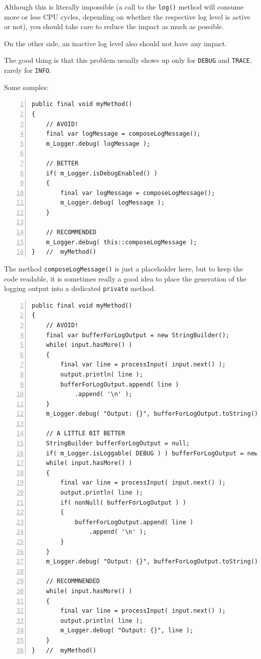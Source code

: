 \documentclass[11pt,a4paper, titlepage, parskip=half, headsepline, footsepline, cleardoublepage=current, headheight=1cm]{scrbook}
\begin{document}
Although this is literally impossible (a call to the \lstinline|log()| method will consume more or less CPU cycles, depending on whether the respective log level is active or not), you should take care to reduce the impact as much as possible.

On the other side, an inactive log level also should not have any impact.

The good thing is that this problem usually shows up only for \verb#DEBUG# and \verb#TRACE#, rarely for \verb#INFO#.

Some samples:
\begin{lstlisting}[numbers=left]
public final void myMethod()
{
    // AVOID!
    final var logMessage = composeLogMessage();
    m_Logger.debug( logMessage );
    
    // BETTER
    if( m_Logger.isDebugEnabled() )
    {
        final var logMessage = composeLogMessage();
        m_Logger.debug( logMessage );
    }
    
    // RECOMMENDED
    m_Logger.debug( this::composeLogMessage );
}   //  myMethod()
\end{lstlisting}

The method \lstinline|composeLogMessage()| is just a placeholder here, but to keep the code readable, it is sometimes really a good idea to place the generation of the logging output into a dedicated \lstinline|private| method.

\begin{lstlisting}[numbers=left]
public final void myMethod()
{
    // AVOID!
    final var bufferForLogOutput = new StringBuilder();
    while( input.hasMore() )
    {
        final var line = processInput( input.next() );
        output.println( line );
        bufferForLogOutput.append( line )
            .append( '\n' );
    }
    m_Logger.debug( "Output: {}", bufferForLogOutput.toString() );
    
    // A LITTLE BIT BETTER
    StringBuilder bufferForLogOutput = null;
    if( m_Logger.isLoggable( DEBUG ) ) bufferForLogOutput = new StringBuilder();
    while( input.hasMore() )
    {
        final var line = processInput( input.next() );
        output.println( line );
        if( nonNull( bufferForLogOutput ) )
        {
        	bufferForLogOutput.append( line )
            	.append( '\n' );
        }
    }
    m_Logger.debug( "Output: {}", bufferForLogOutput.toString() );
    
    // RECOMMNENDED
    while( input.hasMore() )
    {
        final var line = processInput( input.next() );
        output.println( line );
        m_Logger.debug( "Output: {}", line );
    }
}   //  myMethod()
\end{lstlisting}
\end{document}
